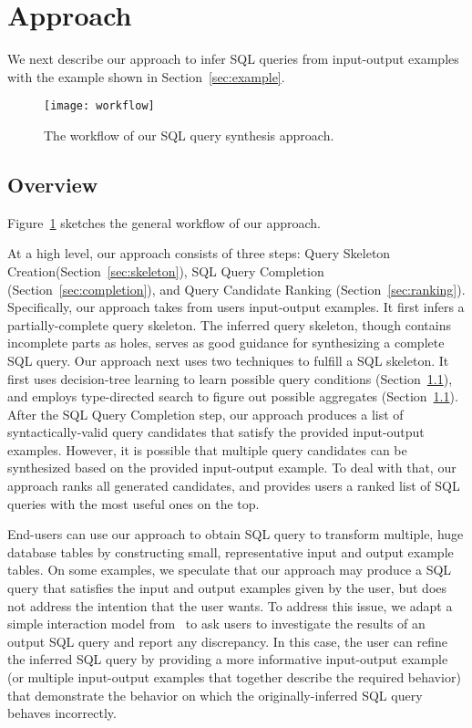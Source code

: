 
\section{Approach}
\label{sec:approach}



We next describe our approach to infer SQL queries from 
input-output examples with the example shown 
in Section~\ref{sec:example}. 

\begin{figure}[t]
  \centering
  \texttt{[image: workflow]}
  \vspace*{-5.0ex}\caption {{\label{fig:workflow} The workflow of our SQL query synthesis approach.
}}

\end{figure}

\subsection{Overview}
Figure~\ref{fig:workflow} sketches the general workflow of our approach.

At a high level, our approach consists of three steps: Query Skeleton
Creation(Section~\ref{sec:skeleton}), SQL Query Completion
(Section~\ref{sec:completion}), and Query Candidate Ranking (Section~\ref{sec:ranking}).
Specifically, our approach takes from users input-output examples. It first infers
a partially-complete query skeleton. The inferred query skeleton, though contains
incomplete parts as holes, serves as good guidance for synthesizing a complete SQL query.
Our approach next uses two techniques to fulfill a SQL skeleton. It first
uses decision-tree learning to learn possible query conditions (Section~\ref{}), and
 employs type-directed search to figure out possible aggregates (Section~\ref{}).
After the SQL Query Completion step, our approach produces a list of syntactically-valid
query candidates that satisfy the provided input-output examples.
However, it is possible that multiple query candidates can be synthesized based on the
provided input-output example. To deal with that, our approach ranks all generated candidates,
and provides users a ranked list of SQL queries with the most useful ones on the top. 


End-users can use our approach to obtain SQL query to transform
multiple, huge database tables by constructing small, representative
input and output example tables. On some examples, we speculate
that our approach
may produce a SQL query that satisfies the input and output examples
given by the user, but does not address the intention
that the user wants. To address this issue, we adapt a simple
interaction model from~\cite{Harris:2011} to ask users to investigate the results of
an output SQL query and report any discrepancy. In this case,
the user can refine the inferred SQL query by providing a more
informative input-output example (or multiple input-output examples
that together describe the required behavior) that demonstrate the behavior on
which the originally-inferred SQL query behaves incorrectly.










